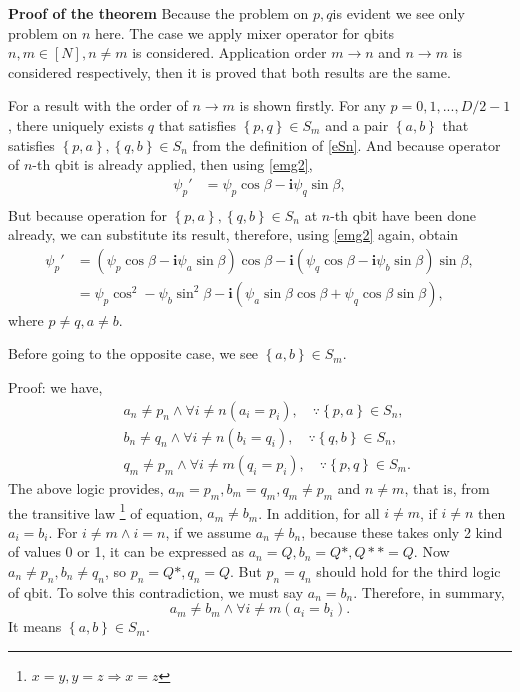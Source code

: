 \documentclass[a4paper]{article}
\newcommand{\eqlabel}[1]{\label{#1}}
\newcommand{\br}[1]{\left(#1\right)}
\newcommand{\cbr}[1]{\left\{#1\right\}}
\newcommand{\ci}{\mathbf{i}}
\begin{document}
\textbf{Proof of the theorem} Because the problem on \(p, q\)is evident we see only problem on \(n\) here. The case we apply mixer operator for qbits \(n,m\in [N], n\neq m\) is considered. Application order \(m \to n\) and \(n\to m\) is considered respectively, then it is proved that both results are the same. 

For a result with the order of \(n\to m\) is shown firstly. For any \(p=0,1,...,D/2-1\), there uniquely exists \(q\) that satisfies \(\cbr{p, q}\in S_{m}\) and a pair \(\cbr{a, b}\) that satisfies \(\cbr{p, a}, \cbr{q, b}\in S_{n}\) from the definition of \eqref{eSn}. And because  operator of \(n\)-th qbit is already applied, then using \eqref{emg2},
\begin{align}
    \nonumber
    \psi_{p}' &= \psi_p \cos\beta - \ci\psi_q \sin \beta, \\
\end{align}
But because operation for \(\cbr{p, a}, \cbr{q, b}\in S_n\) at \(n\)-th qbit have been done already, we can substitute its result, therefore, using \eqref{emg2} again, obtain 
\begin{align}
    \nonumber
    \psi_{p}' &=  (\psi_{p}\cos\beta - \ci\psi_{a} \sin \beta)\cos\beta - \ci(\psi_q \cos \beta - \ci \psi_b \sin \beta) \sin \beta, \\
    \eqlabel{eqn2m}
    & = \psi_p\cos^2 - \psi_b\sin^2\beta - \ci\br{\psi_a \sin\beta\cos\beta + \psi_q\cos\beta\sin\beta},
\end{align}
where \(p\neq q, a\neq b\). 

Before going to the opposite case, we see \(\cbr{a, b}\in S_{m}\).

Proof: we have,
\begin{align*}
    &a_n \neq p_n\land \forall i\neq n(a_i = p_i), \quad\because \cbr{p, a}\in S_n,\\
    & b_n \neq q_n\land \forall i\neq n(b_i = q_i), \quad\because \cbr{q, b}\in S_n, \\\
    &q_m\neq p_m\land\forall i\neq m (q_i=p_i), \quad\because \cbr{p, q}\in S_m.
\end{align*}
The above logic provides, \(a_m = p_m, b_m = q_m, q_m\neq p_m\)  and \(n\neq m\), that is, from the transitive law \footnote{\(x = y, y=z\Rightarrow x=z\)} of equation, \(a_m \neq b_m\). In addition, for all \(i\neq m\), if \(i\neq n\) then \(a_i = b_i\). For \(i\neq m \land i=n\), if we assume \(a_n\neq b_n\), because these takes only 2 kind of values 0 or 1, it can be expressed as \(a_n = Q, b_n = Q*, Q** = Q\). Now \(a_n\neq p_n, b_n\neq q_n\), so \(p_n = Q*, q_n = Q\). But \(p_n= q_n\) should hold for the third logic of qbit. To solve this contradiction, we must say \(a_n = b_n\). Therefore, in summary, 
\[
 a_m \neq b_m\land \forall i\neq m\br{a_i=b_i}.
\]
It means \(\cbr{a, b}\in S_m\).
\end{document}

